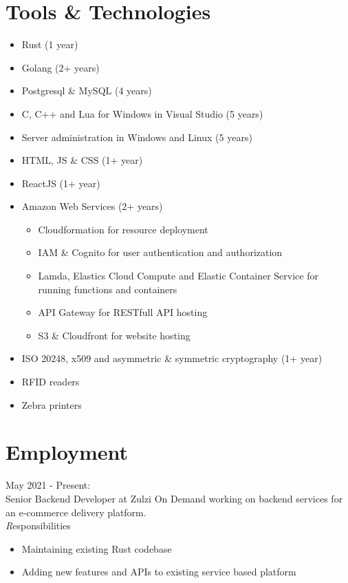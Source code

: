 \documentclass[11pt,a4paper]{article}
\begin{document}
\section*{Tools \& Technologies}
\begin{itemize}

	\item Rust (1 year)
	\item Golang (2+ years)
	\item Postgresql \& MySQL  (4 years)
	\item C, C++ and Lua for Windows in Visual Studio (5 years)
	\item Server administration in Windows and Linux (5 years)
	\item HTML, JS \& CSS (1+ year)
	\item ReactJS (1+ year)
	\item Amazon Web Services (2+ years)
	\begin{itemize}
		\item Cloudformation for resource deployment
		\item IAM \& Cognito for user authentication and authorization
		\item Lamda, Elastics Cloud Compute and Elastic Container Service for running functions and containers
		\item API Gateway for RESTfull API hosting
		\item S3 \& Cloudfront for website hosting 
	\end{itemize}
	\item ISO 20248, x509 and asymmetric \& symmetric cryptography (1+ year)
	\item RFID readers
	\item Zebra printers
\end{itemize}

\section*{Employment}                

{\noindent\large May 2021 - Present:}\\
Senior Backend Developer at Zulzi On Demand working on backend services for an e-commerce delivery platform.
\\

	{\emph Responsibilities}
	\begin{itemize}
                   \item Maintaining existing Rust codebase 
                   \item Adding new features and APIs to existing service based platform
	\end{itemize}
\end{document}
